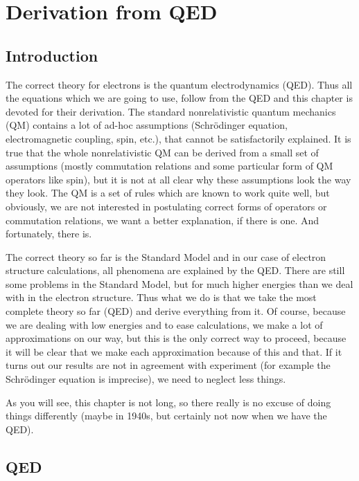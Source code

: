 \chapter{Derivation from QED}

\section{Introduction}

The correct theory for electrons is the quantum electrodynamics (QED). Thus all
the equations which we are going to use, follow from the QED and this chapter
is devoted for their derivation. The standard nonrelativistic quantum
mechanics (QM)
contains a lot of ad-hoc assumptions (Schr\"odinger equation, electromagnetic
coupling, spin, etc.), that cannot be satisfactorily explained. It is true that
the whole nonrelativistic QM can be derived from a small set of
assumptions (mostly commutation relations and some particular form of QM
operators like spin), but it is not at all clear why these assumptions look the
way they look. The QM is a set of rules which are known to work quite
well, but obviously, we are not interested in postulating correct forms of
operators or commutation relations, we want a better explanation, if there is
one. And fortunately, there is.

The correct theory so far is the Standard Model and in our case of electron
structure calculations, all phenomena are explained by the QED. There are still
some problems in the Standard Model, but for much higher energies than
we deal with in the electron structure. Thus what we do is that we take
the most complete theory so far (QED) and derive everything from it. Of course,
because we are dealing with low energies and to ease calculations, we make a
lot of approximations on our way, but this is the only correct way to
proceed, because it will be clear that we make each approximation because of
this and that. If it turns out our results are not in agreement with experiment
(for example the Schr\"odinger equation is imprecise), we need to neglect
less things. 

As you will see, this chapter is not long, so there really is no excuse of
doing things differently (maybe in 1940s, but certainly not now when we have
the QED). 



\def\L{L}

\section{QED}

